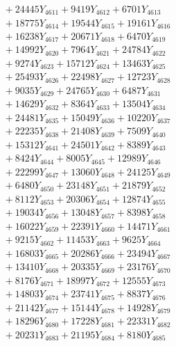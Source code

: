 \documentclass[a4paper,10pt]{article}
\begin{document}
{\begin{align}
&\;  + 24445 Y_{4611} + 9419 Y_{4612} + 6701 Y_{4613} \\[0.3ex]
&\;  + 18775 Y_{4614} + 19544 Y_{4615} + 19161 Y_{4616} \\[0.3ex]
&\;  + 16238 Y_{4617} + 20671 Y_{4618} + 6470 Y_{4619} \\[0.5ex]\allowbreak
&\;  + 14992 Y_{4620} + 7964 Y_{4621} + 24784 Y_{4622} \\[0.3ex]
&\;  + 9274 Y_{4623} + 15712 Y_{4624} + 13463 Y_{4625} \\[0.3ex]
&\;  + 25493 Y_{4626} + 22498 Y_{4627} + 12723 Y_{4628} \\[0.3ex]
&\;  + 9035 Y_{4629} + 24765 Y_{4630} + 6487 Y_{4631} \\[0.3ex]
&\;  + 14629 Y_{4632} + 8364 Y_{4633} + 13504 Y_{4634} \\[0.3ex]
&\;  + 24481 Y_{4635} + 15049 Y_{4636} + 10220 Y_{4637} \\[0.3ex]
&\;  + 22235 Y_{4638} + 21408 Y_{4639} + 7509 Y_{4640} \\[0.3ex]
&\;  + 15312 Y_{4641} + 24501 Y_{4642} + 8389 Y_{4643} \\[0.3ex]
&\;  + 8424 Y_{4644} + 8005 Y_{4645} + 12989 Y_{4646} \\[0.3ex]
&\;  + 22299 Y_{4647} + 13060 Y_{4648} + 24125 Y_{4649} \\[0.5ex]\allowbreak
&\;  + 6480 Y_{4650} + 23148 Y_{4651} + 21879 Y_{4652} \\[0.3ex]
&\;  + 8112 Y_{4653} + 20306 Y_{4654} + 12874 Y_{4655} \\[0.3ex]
&\;  + 19034 Y_{4656} + 13048 Y_{4657} + 8398 Y_{4658} \\[0.3ex]
&\;  + 16022 Y_{4659} + 22391 Y_{4660} + 14471 Y_{4661} \\[0.3ex]
&\;  + 9215 Y_{4662} + 11453 Y_{4663} + 9625 Y_{4664} \\[0.3ex]
&\;  + 16803 Y_{4665} + 20286 Y_{4666} + 23494 Y_{4667} \\[0.3ex]
&\;  + 13410 Y_{4668} + 20335 Y_{4669} + 23176 Y_{4670} \\[0.3ex]
&\;  + 8176 Y_{4671} + 18997 Y_{4672} + 12555 Y_{4673} \\[0.3ex]
&\;  + 14803 Y_{4674} + 23741 Y_{4675} + 8837 Y_{4676} \\[0.3ex]
&\;  + 21142 Y_{4677} + 15144 Y_{4678} + 14928 Y_{4679} \\[0.5ex]\allowbreak
&\;  + 18296 Y_{4680} + 17228 Y_{4681} + 22331 Y_{4682} \\[0.3ex]
&\;  + 20231 Y_{4683} + 21195 Y_{4684} + 8180 Y_{4685} \\[0.3ex]

\end{align}}
\end{document}
